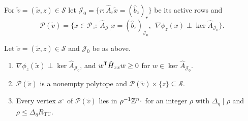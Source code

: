 \begin{definition}\label{def:tu-statpoly}
For $\tilde v=(\tilde x,z)\in\mathcal S$ let
$\mathcal J_0=\{r:\hat A_r\tilde x=(\hat b_z)_r\}$ be its active rows and
\[
\mathcal P(\tilde v)=\bigl\{x\in\mathcal P_z:\
\hat A_{\mathcal J_0}x=(\hat b_z)_{\mathcal J_0},\ \
\nabla\phi_z(x)\perp\ker\hat A_{\mathcal J_0}\bigr\}.
\]
\end{definition}

\begin{lemma}\label{lem:tu-statpoly}
Let $\tilde v=(\tilde x,z)\in\mathcal S$ and $\mathcal J_0$ be as above.
\begin{enumerate}[label=(\alph*)]
\item $\nabla\phi_z(\tilde x)\perp\ker\hat A_{\mathcal J_0}$, and
$w^{\mathsf T}\hat H_{xx}w\ge0$ for $w\in\ker\hat A_{\mathcal J_0}$.
\item $\mathcal P(\tilde v)$ is a nonempty polytope and
$\mathcal P(\tilde v)\times\{z\}\subseteq\mathcal S$.
\item Every vertex $x^\circ$ of $\mathcal P(\tilde v)$ lies in
$\rho^{-1}\mathbb Z^{n_c}$ for an integer $\rho$ with $\Delta_\eta\mid\rho$ and
$\rho\le\Delta_\eta R_{\mathrm{TU}}$.
\end{enumerate}
\end{lemma}

